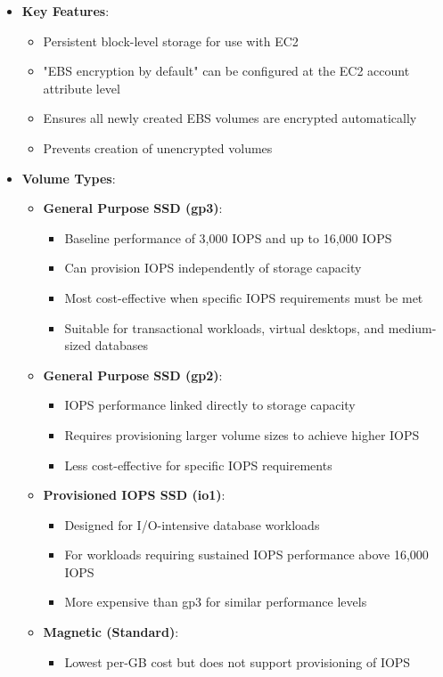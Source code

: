 \documentclass[11pt,a4paper]{report}
\begin{document}
\begin{itemize}
  \item \textbf{Key Features}:
\begin{itemize}
  \item Persistent block-level storage for use with EC2
  \item "EBS encryption by default" can be configured at the EC2 account attribute level
  \item Ensures all newly created EBS volumes are encrypted automatically
  \item Prevents creation of unencrypted volumes
\end{itemize}
  \item \textbf{Volume Types}:
\begin{itemize}
  \item \textbf{General Purpose SSD (gp3)}:
\begin{itemize}
  \item Baseline performance of 3,000 IOPS and up to 16,000 IOPS
  \item Can provision IOPS independently of storage capacity
  \item Most cost-effective when specific IOPS requirements must be met
  \item Suitable for transactional workloads, virtual desktops, and medium-sized databases
\end{itemize}
  \item \textbf{General Purpose SSD (gp2)}:
\begin{itemize}
  \item IOPS performance linked directly to storage capacity
  \item Requires provisioning larger volume sizes to achieve higher IOPS
  \item Less cost-effective for specific IOPS requirements
\end{itemize}
  \item \textbf{Provisioned IOPS SSD (io1)}:
\begin{itemize}
  \item Designed for I/O-intensive database workloads
  \item For workloads requiring sustained IOPS performance above 16,000 IOPS
  \item More expensive than gp3 for similar performance levels
\end{itemize}
  \item \textbf{Magnetic (Standard)}:
\begin{itemize}
  \item Lowest per-GB cost but does not support provisioning of IOPS

\end{itemize}
\end{itemize}
\end{itemize}
\end{document}
